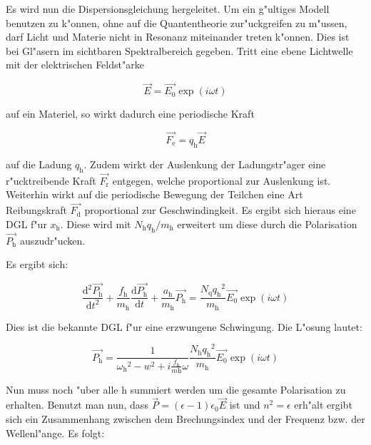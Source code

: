 	Es wird nun die Dispersionsgleichung hergeleitet.
	Um ein g"ultiges Modell benutzen zu k"onnen, ohne auf die Quantentheorie zur"uckgreifen zu m"ussen, darf Licht und Materie nicht in Resonanz miteinander treten k"onnen.
	Dies ist bei Gl"asern im sichtbaren Spektralbereich gegeben.
	Tritt eine ebene Lichtwelle mit der elektrischen Feldst"arke 

	\begin{equation}
		\vec{E} = \vec{E_\mathrm{0}} \exp{(i \omega t)}
	\end{equation}

	auf ein Materiel, so wirkt dadurch eine periodische Kraft

	\begin{equation}
		\vec{F_\mathrm{e}} = q_\mathrm{h} \vec{E}
	\end{equation}

	auf die Ladung $q_\mathrm{h}$.
	Zudem wirkt der Auslenkung der Ladungstr"ager eine r"ucktreibende Kraft $\vec{F_\mathrm{r}}$ entgegen, welche proportional zur Auslenkung ist. Weiterhin wirkt auf die periodische Bewegung der Teilchen eine Art Reibungskraft $\vec{F_\mathrm{d}}$ proportional zur Geschwindingkeit.
	Es ergibt sich hieraus eine DGL f"ur $x_\mathrm{h}$. Diese wird mit $N_\mathrm{h} q_\mathrm{h} / m_\mathrm{h}$ erweitert um diese durch die Polarisation $\vec{P_\mathrm{h}}$ auszudr"ucken. 

	Es ergibt sich:

	\begin{equation}
		\frac{\mathrm{d}^2 \vec{P_\mathrm{h}}}{\mathrm{d} t^2} + \frac{f_\mathrm{h}}{m_\mathrm{h}} \frac{\mathrm{d} \vec{P_\mathrm{h}}}{\mathrm{d} t} + \frac{a_\mathrm{h}}{m_\mathrm{h}} \vec{P_\mathrm{h}} = \frac{N_\mathrm{q} {q_\mathrm{h}}^2}{m_\mathrm{h}} \vec{E_\mathrm{0}} \exp{(i \omega t)} 
	\end{equation}

	Dies ist die bekannte DGL f"ur eine erzwungene Schwingung. Die L"osung lautet:

	\begin{equation}
		\vec{P_\mathrm{h}} = \frac{1}{{\omega_\mathrm{h}}^2 - w^2 + i \frac{f_\mathrm{h}}{m\mathrm{h}} \omega} \frac{N_\mathrm{h} {q_\mathrm{h}}^2}{m_\mathrm{h}} \vec{E_\mathrm{0}} \exp{(i \omega t)} 
	\end{equation}

	Nun muss noch "uber alle h summiert werden um die gesamte Polarisation zu erhalten. Benutzt man nun, dass $\vec{P} = (\epsilon - 1) \epsilon_\mathrm{0} \vec{E}$  ist und $n^2 = \epsilon$ erh"alt ergibt sich ein Zusammenhang zwischen dem Brechungsindex und der Frequenz bzw. der Wellenl"ange.
	Es folgt:

